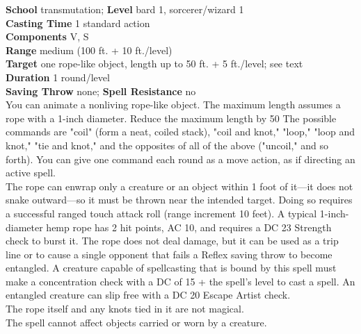 \textbf{School} transmutation; \textbf{Level} bard 1, sorcerer/wizard 1\\
\textbf{Casting Time} 1 standard action\\
\textbf{Components} V, S\\
\textbf{Range }medium (100 ft. + 10 ft./level)\\
\textbf{Target} one rope-like object, length up to 50 ft. + 5 ft./level; see text\\
\textbf{Duration} 1 round/level\\
\textbf{Saving Throw} none;\textbf{ Spell Resistance} no\\
You can animate a nonliving rope-like object. The maximum length assumes a rope with a 1-inch diameter. Reduce the maximum length by 50%
The possible commands are "coil" (form a neat, coiled stack), "coil and knot," "loop," "loop and knot," "tie and knot," and the opposites of all of the above ("uncoil," and so forth). You can give one command each round as a move action, as if directing an active spell.\\
The rope can enwrap only a creature or an object within 1 foot of it---it does not snake outward---so it must be thrown near the intended target. Doing so requires a successful ranged touch attack roll (range increment 10 feet). A typical 1-inch-diameter hemp rope has 2 hit points, AC 10, and requires a DC 23 Strength check to burst it. The rope does not deal damage, but it can be used as a trip line or to cause a single opponent that fails a Reflex saving throw to become entangled. A creature capable of spellcasting that is bound by this spell must make a concentration check with a DC of 15 + the spell's level to cast a spell. An entangled creature can slip free with a DC 20 Escape Artist check.\\
The rope itself and any knots tied in it are not magical.\\
The spell cannot affect objects carried or worn by a creature.\\
